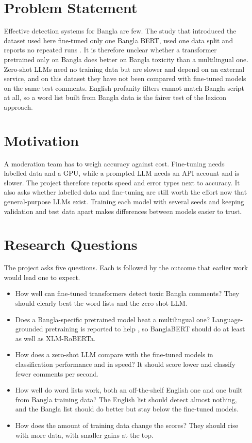 \section{Problem Statement}

Effective detection systems for Bangla are few. The study that introduced the dataset used here fine-tuned only one Bangla BERT, used one data split and reports no repeated runs \cite{belal2023toxic}. It is therefore unclear whether a transformer pretrained only on Bangla does better on Bangla toxicity than a multilingual one. Zero-shot LLMs need no training data but are slower and depend on an external service, and on this dataset they have not been compared with fine-tuned models on the same test comments. English profanity filters cannot match Bangla script at all, so a word list built from Bangla data is the fairer test of the lexicon approach.

\section{Motivation}

A moderation team has to weigh accuracy against cost. Fine-tuning needs labelled data and a GPU, while a prompted LLM needs an API account and is slower. The project therefore reports speed and error types next to accuracy. It also asks whether labelled data and fine-tuning are still worth the effort now that general-purpose LLMs exist. Training each model with several seeds and keeping validation and test data apart makes differences between models easier to trust.

\section{Research Questions}

The project asks five questions. Each is followed by the outcome that earlier work would lead one to expect.

\begin{itemize}
  \item How well can fine-tuned transformers detect toxic Bangla comments? They should clearly beat the word lists and the zero-shot LLM.
  \item Does a Bangla-specific pretrained model beat a multilingual one? Language-grounded pretraining is reported to help \cite{hasan2025banglamultihate}, so BanglaBERT should do at least as well as XLM-RoBERTa.
  \item How does a zero-shot LLM compare with the fine-tuned models in classification performance and in speed? It should score lower and classify fewer comments per second.
  \item How well do word lists work, both an off-the-shelf English one and one built from Bangla training data? The English list should detect almost nothing, and the Bangla list should do better but stay below the fine-tuned models.
  \item How does the amount of training data change the scores? They should rise with more data, with smaller gains at the top.
\end{itemize}

